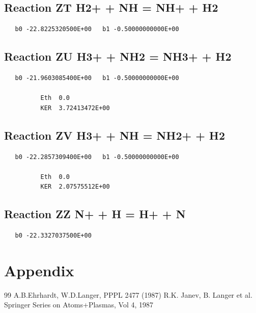 \documentclass[12pt]{article}
\begin{document}
\subsection{
Reaction ZT H2+ + NH = NH+ + H2 }
\begin{small}\begin{verbatim}
   b0 -22.8225320500E+00   b1 -0.50000000000E+00
\end{verbatim}\end{small}
\newpage

\subsection{
Reaction ZU H3+ + NH2 = NH3+ + H2 }
\begin{small}\begin{verbatim}
   b0 -21.9603085400E+00   b1 -0.50000000000E+00

          Eth  0.0
          KER  3.72413472E+00

\end{verbatim}\end{small}
\newpage

\subsection{
Reaction ZV H3+ + NH = NH2+ + H2 }
\begin{small}\begin{verbatim}
   b0 -22.2857309400E+00   b1 -0.50000000000E+00

          Eth  0.0
          KER  2.07575512E+00

\end{verbatim}\end{small}
\newpage

\subsection{
Reaction ZZ N+ + H = H+ + N }
\begin{small}\begin{verbatim}
   b0 -22.3327037500E+00
\end{verbatim}\end{small}
\newpage



\section{Appendix}
\newpage
\begin{thebibliography}{99}
  A.B.Ehrhardt, W.D.Langer, PPPL 2477 (1987)
 R.K. Janev, B. Langer et al.  Springer Series on Atoms+Plasmas,
                   Vol 4, 1987
 \end{thebibliography}
\end{document}

